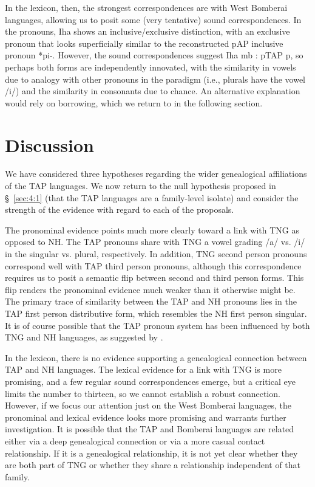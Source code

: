 In the lexicon, then, the strongest correspondences are with West Bomberai languages, allowing us to posit some (very tentative) sound correspondences. In the pronouns, Iha shows an inclusive/exclusive distinction, with an exclusive pronoun that looks superficially similar to the reconstructed pAP inclusive pronoun *pi-. However, the sound correspondences suggest Iha mb : pTAP p, so perhaps both forms are independently innovated, with the similarity in vowels due to analogy with other pronouns in the paradigm (i.e., plurals have the vowel /i/) and the similarity in consonants due to chance. An alternative explanation would rely on borrowing, which we return to in the following section.

\section{Discussion} \label{sec:4:6}
We have considered three hypotheses regarding the wider genealogical affiliations of the TAP languages. We now return to the null hypothesis proposed in {\S}~\ref{sec:4:1} (that the TAP languages are a family-level isolate) and consider the strength of the evidence with regard to each of the proposals.

The pronominal evidence points much more clearly toward a link with TNG as opposed to NH. The TAP pronouns share with TNG a vowel grading /a/ vs. /i/ in the singular vs. plural, respectively. In addition, TNG second person pronouns correspond well with TAP third person pronouns, although this correspondence requires us to posit a semantic flip between second and third person forms. This flip renders the pronominal evidence much weaker than it otherwise might be. The primary trace of similarity between the TAP and NH pronouns lies in the TAP first person distributive form, which resembles the NH first person singular. It is of course possible that the TAP pronoun system has been influenced by both TNG and NH languages, as suggested by \citet{Donohue2008boundpron}.

In the lexicon, there is no evidence supporting a genealogical connection between TAP and NH languages. The lexical evidence for a link with TNG is more promising, and a few regular sound correspondences emerge, but a critical eye limits the number to thirteen, so we cannot establish a robust connection. However, if we focus our attention just on the West Bomberai languages, the pronominal and lexical evidence looks more promising and warrants further investigation. It is possible that the TAP and Bomberai languages are related either via a deep genealogical connection or via a more casual contact relationship. If it is a genealogical relationship, it is not yet clear whether they are both part of TNG or whether they share a relationship independent of that family.

